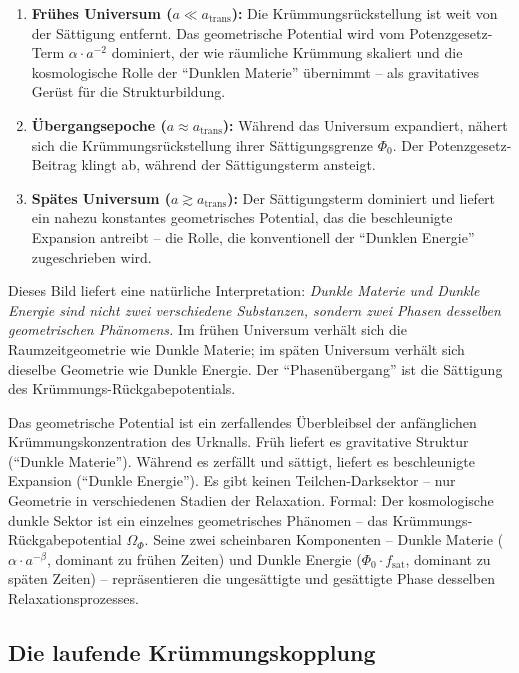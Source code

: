 \documentclass[aps,prd,twocolumn,superscriptaddress,nofootinbib,floatfix]{revtex4-2}
\begin{document}
\begin{enumerate}
\item \textbf{Frühes Universum ($a \ll a_{\mathrm{trans}}$):} Die Krümmungsrückstellung ist weit von der Sättigung entfernt. Das geometrische Potential wird vom Potenzgesetz-Term $\alpha \cdot a^{-2}$ dominiert, der wie räumliche Krümmung skaliert und die kosmologische Rolle der "`Dunklen Materie"' übernimmt -- als gravitatives Gerüst für die Strukturbildung.

\item \textbf{Übergangsepoche ($a \approx a_{\mathrm{trans}}$):} Während das Universum expandiert, nähert sich die Krümmungsrückstellung ihrer Sättigungsgrenze $\Phi_0$. Der Potenzgesetz-Beitrag klingt ab, während der Sättigungsterm ansteigt.

\item \textbf{Spätes Universum ($a \gtrsim a_{\mathrm{trans}}$):} Der Sättigungsterm dominiert und liefert ein nahezu konstantes geometrisches Potential, das die beschleunigte Expansion antreibt -- die Rolle, die konventionell der "`Dunklen Energie"' zugeschrieben wird.
\end{enumerate}

Dieses Bild liefert eine natürliche Interpretation: \textit{Dunkle Materie und Dunkle Energie sind nicht zwei verschiedene Substanzen, sondern zwei Phasen desselben geometrischen Phänomens.} Im frühen Universum verhält sich die Raumzeitgeometrie wie Dunkle Materie; im späten Universum verhält sich dieselbe Geometrie wie Dunkle Energie. Der "`Phasenübergang"' ist die Sättigung des Krümmungs-Rückgabepotentials.

Das geometrische Potential ist ein zerfallendes Überbleibsel der anfänglichen Krümmungskonzentration des Urknalls. Früh liefert es gravitative Struktur ("`Dunkle Materie"'). Während es zerfällt und sättigt, liefert es beschleunigte Expansion ("`Dunkle Energie"'). Es gibt keinen Teilchen-Darksektor -- nur Geometrie in verschiedenen Stadien der Relaxation. Formal: Der kosmologische dunkle Sektor ist ein einzelnes geometrisches Phänomen -- das Krümmungs-Rückgabepotential $\Omega_\Phi$. Seine zwei scheinbaren Komponenten -- Dunkle Materie ($\alpha \cdot a^{-\beta}$, dominant zu frühen Zeiten) und Dunkle Energie ($\Phi_0 \cdot f_{\mathrm{sat}}$, dominant zu späten Zeiten) -- repräsentieren die ungesättigte und gesättigte Phase desselben Relaxationsprozesses.

\subsection{Die laufende Krümmungskopplung}
\label{subsec:running_beta}
\end{document}
